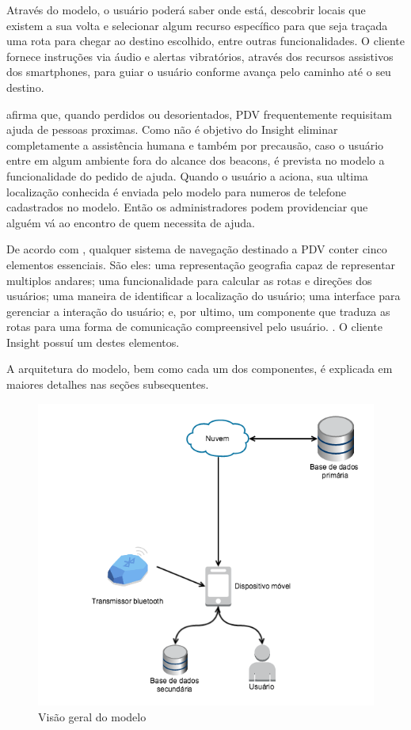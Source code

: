 \documentclass[english,brazilian]{UNISINOSmonografia}
\begin{document}
Através do modelo, o usuário poderá saber onde está, descobrir locais que existem a sua volta e selecionar algum recurso específico para que seja traçada uma rota para chegar ao destino escolhido, entre outras funcionalidades. O cliente fornece instruções via áudio e alertas vibratórios, através dos recursos assistivos dos smartphones, para guiar o usuário conforme avança pelo caminho até o seu destino.

 afirma que, quando perdidos ou desorientados, PDV frequentemente requisitam ajuda de pessoas proximas. Como não é objetivo do Insight eliminar completamente a assistência humana e também por precausão, caso o usuário entre em algum ambiente fora do alcance dos beacons, é prevista no modelo a funcionalidade do pedido de ajuda. Quando o usuário a aciona, sua ultima localização conhecida é enviada pelo modelo para numeros de telefone cadastrados no modelo. Então os administradores podem providenciar que alguém vá ao encontro de quem necessita de ajuda.

De acordo com , qualquer sistema de navegação destinado a PDV conter cinco elementos essenciais. São eles: uma representação geografia capaz de representar multiplos andares; uma funcionalidade para calcular as rotas e direções dos usuários; uma maneira de identificar a localização do usuário; uma interface para gerenciar a interação do usuário; e, por ultimo, um componente que traduza as rotas para uma forma de comunicação compreensivel pelo usuário. \cite{gedawy2011designing}. O cliente Insight possuí um destes elementos.

A arquitetura do modelo, bem como cada um dos componentes, é explicada em maiores detalhes nas seções subsequentes.

\begin{figure}[!ht]
	\caption{Visão geral do modelo}
	\label{fig:visaoGeral}
	\centering%
	\begin{minipage}{.8\textwidth}
		\includegraphics[width=\textwidth]{imgs/visaoGeral}
	\end{minipage}
\end{figure}
\end{document}
